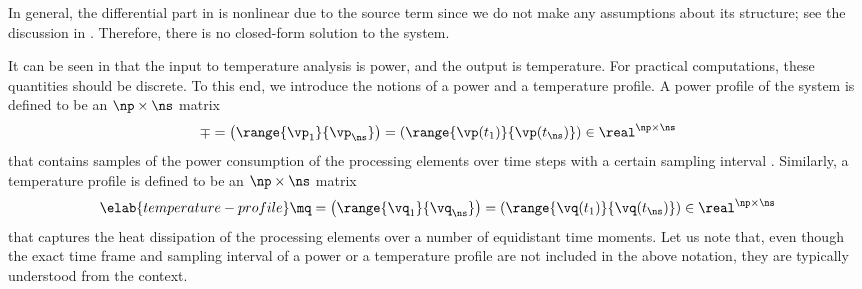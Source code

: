 In general, the differential part in  is
nonlinear due to the source term \vp since we do not make any assumptions about
its structure; see the discussion in . Therefore, there is no
closed-form solution to the system.

It can be seen in  that the input to
temperature analysis is power, and the output is temperature. For practical
computations, these quantities should be discrete. To this end, we introduce the
notions of a power and a temperature profile. A power profile of the system is
defined to be an $\np \times \ns$ matrix
\[
  \mp
  = \left(\range{\vp_1}{\vp_\ns}\right)
  = \left(\range{\vp(t_1)}{\vp(t_\ns)}\right) \in \real^{\np \times \ns}
\]
that contains \ns samples of the power consumption of the \np processing
elements over \ns time steps with a certain sampling interval \dt. Similarly, a
temperature profile is defined to be an $\np \times \ns$ matrix
\begin{equation} \elab{temperature-profile}
  \mq
  = \left(\range{\vq_1}{\vq_\ns}\right)
  = \left(\range{\vq(t_1)}{\vq(t_\ns)}\right) \in \real^{\np \times \ns}
\end{equation}
that captures the heat dissipation of the processing elements over a number of
equidistant time moments. Let us note that, even though the exact time frame and
sampling interval of a power or a temperature profile are not included in the
above notation, they are typically understood from the context.
